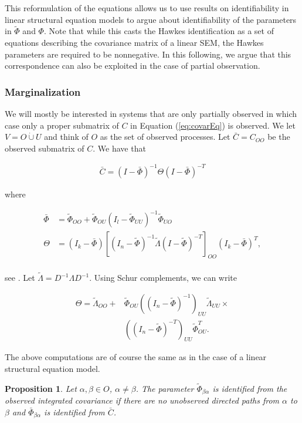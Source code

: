 \documentclass[accepted]{uai2021} %
\newtheorem{prop}[thm]{Proposition}
\newcommand{\disjU}{\mathbin{\dot{\cup}}}
\begin{document}
This reformulation of the equations allows us to use results on identifiability 
in linear structural 
equation models to argue about 
identifiability of the parameters in $\tilde{\Phi}$ and $\Phi$. Note that while 
this 
casts the Hawkes identification as a set of equations describing the covariance 
matrix of a linear SEM, the Hawkes parameters are required to be nonnegative. 
In this 
following, we argue that this correspondence can also be exploited in the case 
of partial observation.


\subsubsection{Marginalization}
\label{sssec:marg} 

We will mostly be interested in systems that are only partially observed in 
which case only a proper submatrix of $C$ in Equation (\ref{eq:covarEq}) is 
observed. We let $V = O \disjU 
U$ and think of $O$ as the set of observed processes. Let $\bar{C} = C_{OO}$ be 
the observed submatrix of $C$. We 
have 
that 

\begin{align}
\bar{C} = (I - \bar{\Phi})^{-1}\Theta(I - \bar{\Phi})^{-T}
\end{align}

where 

\begin{align*}
\bar{\Phi} & = \tilde{\Phi}_{OO} +  \tilde{\Phi}_{OU}(I_l - 
\tilde{\Phi}_{UU})^{-1}\tilde{\Phi}_{UO} \\
\Theta & = (I_k-\bar{\Phi})[(I_n - \tilde{\Phi})^{-1}\tilde{\Lambda}(I - 
\tilde{\Phi})^{-T}]_{OO}(I_k-\bar{\Phi})^T, \\
\end{align*}

see \cite{hyttinen2012}. Let 
$\tilde{\Lambda} 
= D^{-1}\Lambda D^{-1}$. Using Schur complements, we can write

\begin{align*}
	\Theta =  \tilde{\Lambda}_{OO} + & \tilde{\Phi}_{OU}((I_n - 
	\tilde{\Phi})^{-1})_{UU}\tilde{\Lambda}_{UU} \times  \\ & ((I_n - 
	\tilde{\Phi})^{-T})_{UU}
	\tilde{\Phi}_{OU}^T.
\end{align*}

The above computations are of course the same as in the case of a linear 
structural equation model.

\begin{prop}
	Let $\alpha,\beta \in O$, $\alpha\neq \beta$. The parameter 
	$\tilde{\Phi}_{\beta\alpha}$ is 
	identified 
	from the observed integrated covariance if there 
	are no unobserved directed paths from 
	$\alpha$ to $\beta$ and $\bar{\Phi}_{\beta\alpha}$ is identified from 
	$\bar{C}$.
\end{prop}
\end{document}
